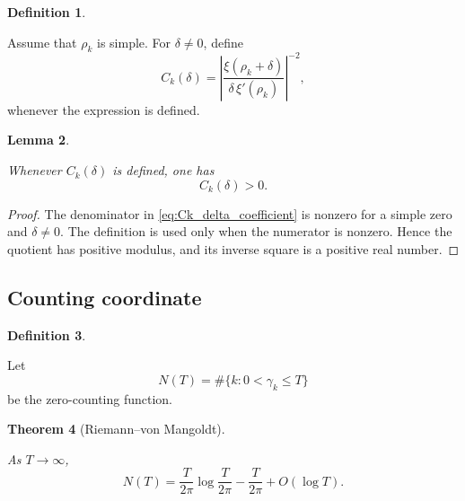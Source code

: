 \documentclass[11pt]{amsart}
\numberwithin{equation}{section}
\theoremstyle{plain}
\newtheorem{theorem}{Theorem}[section]
\newtheorem{lemma}[theorem]{Lemma}
\theoremstyle{definition}
\newtheorem{definition}[theorem]{Definition}
\theoremstyle{remark}
\begin{document}
\begin{definition}
\label{def:Ck_delta_coefficient}

Assume that \(\rho_k\) is simple.  For \(\delta\neq0\), define
\begin{equation}
C_k(\delta)
=
\left|
\frac{\xi(\rho_k+\delta)}{\delta\,\xi'(\rho_k)}
\right|^{-2},
\label{eq:Ck_delta_coefficient}
\end{equation}
whenever the expression is defined.

\end{definition}

\begin{lemma}
\label{lem:Ck_delta_positive}

Whenever \(C_k(\delta)\) is defined, one has
\begin{equation}
C_k(\delta)>0.
\label{eq:Ck_delta_positive}
\end{equation}

\end{lemma}

\begin{proof}
The denominator in \eqref{eq:Ck_delta_coefficient} is nonzero for a simple zero and \(\delta\neq0\).  The definition is used only when the numerator is nonzero.  Hence the quotient has positive modulus, and its inverse square is a positive real number.
\end{proof}

\subsection{Counting coordinate}
\label{subsec:counting_coordinate}

\begin{definition}
\label{def:zero_counting_function}

Let
\begin{equation}
N(T)
=
\#\{k:0<\gamma_k\leq T\}
\label{eq:zero_counting_function}
\end{equation}
be the zero-counting function.

\end{definition}

\begin{theorem}[Riemann--von Mangoldt]
\label{thm:riemann_von_mangoldt_counting}

As \(T\to\infty\),
\begin{equation}
N(T)
=
\frac{T}{2\pi}\log\frac{T}{2\pi}
-
\frac{T}{2\pi}
+
O(\log T).
\label{eq:riemann_von_mangoldt_counting}
\end{equation}

\end{theorem}
\end{document}
